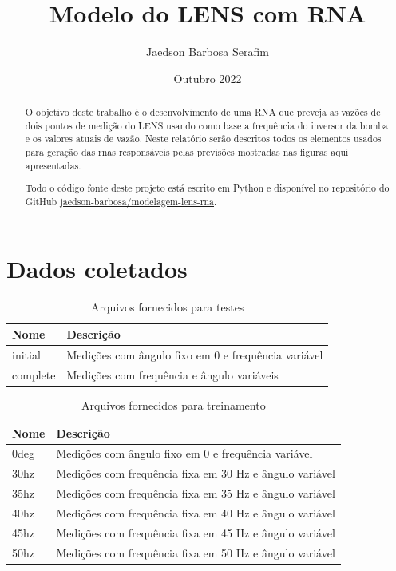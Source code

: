 \documentclass[12pt]{article}
\title{Modelo do LENS com RNA}
\author{Jaedson Barbosa Serafim}
\date{Outubro 2022}
\begin{document}
\maketitle

\begin{abstract}
O objetivo deste trabalho é o desenvolvimento de uma RNA que preveja as vazões de dois pontos de medição do LENS usando como base a frequência do inversor da bomba e os valores atuais de vazão.
Neste relatório serão descritos todos os elementos usados para geração das \acrshort{rna}s responsáveis pelas previsões mostradas nas figuras aqui apresentadas.

Todo o código fonte deste projeto está escrito em Python e disponível no repositório do GitHub 
\href{https://github.com/jaedson-barbosa/modelagem-lens-rna}{jaedson-barbosa/modelagem-lens-rna}.
\end{abstract}

\tableofcontents

\section{Dados coletados}

\begin{table}
\caption{Arquivos fornecidos para testes}
\centering
\begin{tabular}{|l|l|} 
\hline
Nome & Descrição \\ 
\hline
initial & Medições com ângulo fixo em 0 e frequência variável \\ 
\hline
complete & Medições com frequência e ângulo variáveis \\
\hline
\end{tabular}
\label{tab:arquivos_testes}
\end{table}

\begin{table}
\caption{Arquivos fornecidos para treinamento}
\centering
\begin{tabular}{|l|l|} 
\hline
Nome & Descrição \\ 
\hline
0deg & Medições com ângulo fixo em 0 e frequência variável \\ 
\hline
30hz & Medições com frequência fixa em 30 Hz e ângulo variável \\ 
\hline
35hz & Medições com frequência fixa em 35 Hz e ângulo variável \\ 
\hline
40hz & Medições com frequência fixa em 40 Hz e ângulo variável \\ 
\hline
45hz & Medições com frequência fixa em 45 Hz e ângulo variável \\ 
\hline
50hz & Medições com frequência fixa em 50 Hz e ângulo variável \\
\hline
\end{tabular}
\label{tab:arquivos_treinamento}
\end{table}
\end{document}
